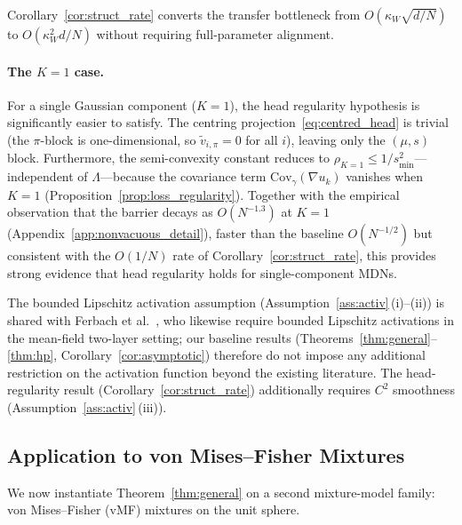 \documentclass[11pt]{article}
\begin{document}
Corollary~\ref{cor:struct_rate} converts the transfer bottleneck from
$O(\kappa_W\sqrt{d/N})$ to $O(\kappa_W^2 d/N)$ without requiring
full-parameter alignment.

\paragraph{The $K=1$ case.}
For a single Gaussian component ($K=1$), the head regularity
hypothesis is significantly easier to satisfy.
The centring projection~\eqref{eq:centred_head} is trivial
(the $\pi$-block is one-dimensional, so
$\tilde v_{i,\pi} = 0$ for all $i$),
leaving only the $(\mu, s)$ block.
Furthermore, the semi-convexity constant reduces to
$\rho_{K=1} \le 1/s_{\min}^2$---independent of
$\Lambda$---because the covariance term
$\mathrm{Cov}_\gamma(\nabla u_k)$ vanishes when $K=1$
(Proposition~\ref{prop:loss_regularity}).
Together with the empirical observation that the barrier
decays as $O(N^{-1.3})$ at $K=1$
(Appendix~\ref{app:nonvacuous_detail}),
faster than the baseline $O(N^{-1/2})$ but consistent with
the $O(1/N)$ rate of Corollary~\ref{cor:struct_rate},
this provides strong evidence that head regularity holds
for single-component MDNs.

The bounded Lipschitz activation assumption
(Assumption~\ref{ass:activ}\,(i)--(ii)) is shared with
Ferbach et al.~\cite{ferbach2024}, who likewise require bounded Lipschitz
activations in the mean-field two-layer setting; our baseline results
(Theorems~\ref{thm:general}--\ref{thm:hp},
Corollary~\ref{cor:asymptotic}) therefore do not impose any
additional restriction on the activation function
beyond the existing literature.
The head-regularity result (Corollary~\ref{cor:struct_rate})
additionally requires $C^2$ smoothness
(Assumption~\ref{ass:activ}\,(iii)).

\subsection{Application to von Mises--Fisher Mixtures}
\label{sec:vmf}

We now instantiate Theorem~\ref{thm:general} on a second
mixture-model family: von Mises--Fisher (vMF) mixtures on the unit
sphere.
\end{document}
